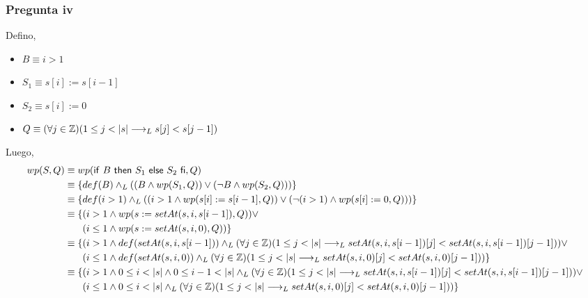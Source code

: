 \subsubsection{Pregunta iv}
Defino,
\begin{itemize}
    \item $ B \equiv i > 1 $
    \item $ S_1 \equiv s[i] := s[i-1] $
    \item $ S_2 \equiv s[i] := 0 $
    \item $ Q \equiv (\forall j \in \mathbb{Z})(1 \leq j < |s| \longrightarrow _L s[j] < s[j-1]) $
\end{itemize}
Luego,
\begin{align*}
    wp(S, Q) &\equiv wp(\mathsf{if}\ B\ \mathsf{then}\ S_1\ \mathsf{else}\ S_2\ \mathsf{fi}, Q) \\
    &\equiv \{ def(B) \land _L ((B \wedge wp(S_1, Q)) \vee (\neg B \wedge wp(S_2, Q))) \} \\
    &\equiv \{ def(i > 1) \land _L ((i > 1 \wedge wp(s[i] := s[i-1], Q)) \vee (\neg (i > 1) \wedge wp(s[i] := 0, Q))) \} \\
    &\equiv \{ (i > 1 \wedge wp(s:= setAt(s, i, s[i-1]), Q)) \vee \\
    &\quad \; \; \; (i \leq 1 \wedge wp(s:=setAt(s,i,0), Q)) \} \\
    &\equiv \{ (i > 1 \wedge def(setAt(s, i, s[i-1])) \land _L (\forall j \in \mathbb{Z})(1 \leq j < |s| \longrightarrow _L setAt(s, i, s[i-1])[j] < setAt(s, i, s[i-1])[j-1])) \vee \\
    &\quad \; \; \; (i \leq 1 \wedge  def(setAt(s,i,0)) \land _L (\forall j \in \mathbb{Z})(1 \leq j < |s| \longrightarrow _L setAt(s,i,0)[j] < setAt(s,i,0)[j-1])) \} \\
    &\equiv \{ (i > 1 \wedge 0 \leq i < |s| \wedge 0 \leq i-1 < |s| \land _L (\forall j \in \mathbb{Z})(1 \leq j < |s| \longrightarrow _L setAt(s, i, s[i-1])[j] < setAt(s, i, s[i-1])[j-1])) \vee \\
    &\quad \; \; \; (i \leq 1 \wedge 0 \leq i < |s| \land _L (\forall j \in \mathbb{Z})(1 \leq j < |s| \longrightarrow _L setAt(s,i,0)[j] < setAt(s,i,0)[j-1])) \} \\
\end{align*}

